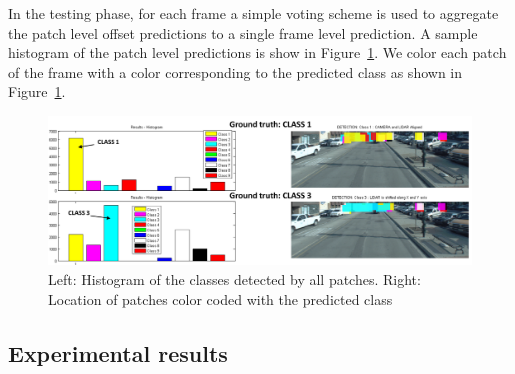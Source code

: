 \documentclass{article}
\begin{document}
In the testing phase, for each frame a simple voting scheme is used to aggregate the patch level offset predictions to a single frame level prediction. A sample histogram of the patch level predictions is show in Figure~\ref{fig:Figures_Voting}. We color each patch of the frame with a color corresponding to the predicted class as shown in Figure~\ref{fig:Figures_Voting}. 

\begin{figure}[htbp]
    \centering
        \includegraphics[scale=0.35]{Voting_final.png}
    \caption{Left: Histogram of the classes detected by all patches. Right: Location of patches color coded with the predicted class}
    \label{fig:Figures_Voting}
\end{figure}


\subsection{Experimental results} %
\label{sub:experimental_results}
\end{document}
